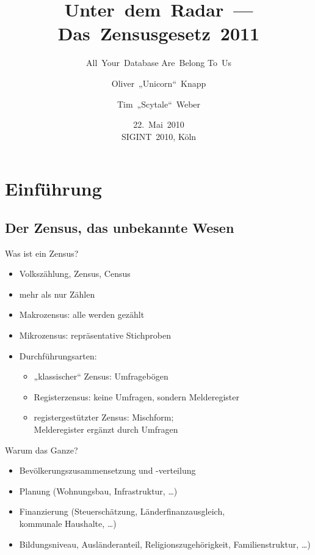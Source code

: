 \documentclass[ignorenonframetext,ucs]{beamer}
\title{Unter~dem~Radar~— Das~Zensusgesetz~2011}
\subtitle{All~Your~Database Are~Belong To~Us}
\author{Oliver~„Unicorn“~Knapp \and Tim~„Scytale“~Weber}
\institute{
	Chaos~Computer~Club~e.V. %
}
\date{22.~Mai~2010\\SIGINT~2010, Köln}
\begin{document}
\frame{\titlepage}

\section{Einführung}


\subsection{Der Zensus, das unbekannte Wesen}

\begin{frame}{Was ist ein Zensus?}\begin{itemize}
\item Volkszählung, Zensus, Census
\item mehr als nur Zählen
\item Makrozensus: alle werden gezählt
\item Mikrozensus: repräsentative Stichproben
\item Durchführungsarten:\begin{itemize}
	\item „klassischer“ Zensus: Umfragebögen
	\item Registerzensus: keine Umfragen, sondern Melderegister
	\item registergestützter Zensus: Mischform;\\Melderegister ergänzt durch Umfragen
\end{itemize}
\end{itemize}\end{frame}

\begin{frame}{Warum das Ganze?}\begin{itemize}
\item Bevölkerungszusammensetzung und -verteilung
\item Planung (Wohnungsbau, Infrastruktur, …)
\item Finanzierung (Steuerschätzung, Länderfinanzausgleich,\\kommunale Haushalte, …)
\item Bildungsniveau, Ausländeranteil, Religionszugehörigkeit, Familienstruktur, …)
\end{itemize}\end{frame}
\end{document}
